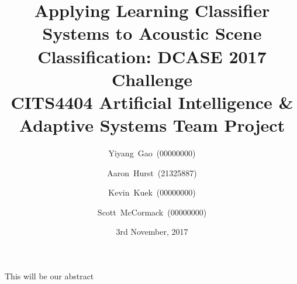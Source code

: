\documentclass[11pt]{article}
\renewenvironment{abstract}
{\small
	\begin{center}
		\bfseries \abstractname\vspace{-.5em}\vspace{0pt}
	\end{center}
	\list{}{
		\setlength{\leftmargin}{.5cm}%
		\setlength{\rightmargin}{\leftmargin}%
	}%
	\item\relax}
{\endlist}
\begin{document}
\listoftodos[Things to do]

\title{
	Applying Learning Classifier Systems to Acoustic Scene Classification: DCASE 2017 Challenge \\
	\vspace{0.1in}
	\large CITS4404 Artificial Intelligence \& Adaptive Systems Team Project
}
\author{Yiyang~Gao~(00000000)}
\author{Aaron~Hurst~(21325887)}
\author{Kevin~Kuek~(00000000)}
\author{Scott~McCormack~(00000000)}

\date{3rd November, 2017}

\maketitle

\begin{abstract}
	This will be our abstract \\
	\lipsum*[2]
\end{abstract}
\end{document}
